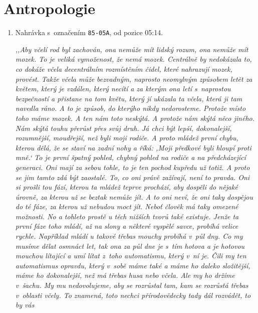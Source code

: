 \begin{enumerate}
{%

}

\end{enumerate}

\section{Antropologie}

\begin{enumerate}

\item{
Nahrávka s~označením \texttt{85-05A}, od pozice 05:14.

\textit{%
,,Aby včelí rod byl zachován, ona nemůže mít lidský rozum, ona nemůže mít mozek.
To je veliká vymoženost, že nemá mozek. Centrálně by nedokázala to, co dokáže
včela decentrálním rozmístěním čidel, které nahrazují mozek, provést. Takže
včela může bezvadným, naprosto neomylným způsobem letět za květem, který je
vzdálen, který necítí a za kterým ona letí s~naprostou bezpečností a přistane na
tom květu, který jí ukázala ta včela, která ji tam navedla
ráno. A to je způsob, do kterýho nikdy nedorosteme. Protože místo
toho máme mozek. A ten nám toto neskýtá. A protože nám skýtá něco jiného. Nám
skýtá touhu přerůst přes svůj druh. Já chci být lepší, dokonalejší, rozumnější,
moudřejší, než byli moji rodiče. A proto mládež první chybu, kterou dělá, že se
staví na zadní nohy a říká: ,Moji předkové byli hloupí proti mně.` To je
první špatný pohled, chybný pohled na rodiče a na předcházející generaci.
Oni mají za sebou tohle, to je ten pochod kupředu už totiž. A proto se jim
tamto zdá být zaostalé. To, co oni právě zažívají, není to pravda. Oni si
prošli tou fází, kterou ta mládež teprve prochází, aby dospěli do nějaké úrovně,
za kterou už se beztak nemůže jít. A to oni neví, že oni taky dospějou do té
fáze, za kterou už nebudou moct jít. Neboť člověk má taky omezené možnosti. No a
tohleto prostě u těch nižších tvorů také existuje. Jenže ta první fáze toho
mládí, až na slony a některé vyspělé savce, probíhá velice rychle. Například
mládí u takové třebas mouchy probíhá v~půl dny. Co my musíme dělat
osmnáct let, tak ona za půl dne je s~tím hotova a je hotovou mouchou lítající a
umí lítat z~toho automatismu, který v~ní je. Čili my ten automatismus opravdu,
který v~sobě máme také a máme ho daleko složitější, máme ho
dokonalejší, než má třebas husa nebo včela. Ale my ho držíme v~šachu. My
mu nedovolujeme, aby se rozrůstal tam, kam se rozrůstá třebas v~oblasti
včely. To znamená, toto nechci přírodovědecky tady dál rozvádět, to by vás
}}
\end{enumerate}
